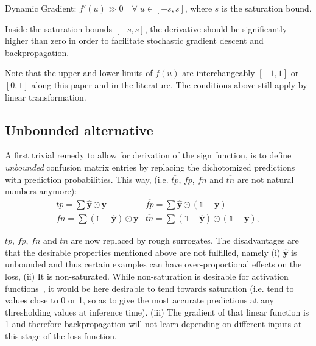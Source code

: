 \begin{property}
  Dynamic Gradient: $f'(u) \gg 0 \quad \forall \; u \in [-s, s]$, where $s$ is the saturation bound.
\end{property}

Inside the saturation bounds $[-s, s]$, the derivative should be significantly higher than zero in order to facilitate stochastic gradient descent and backpropagation.

Note that the upper and lower limits of $f(u)$ are interchangeably $[-1,1]$ or $[0,1]$ along this paper and in the literature. The conditions above still apply by linear transformation.


\subsection{Unbounded alternative}
\label{subsec:unbounded}

A first trivial remedy to allow for derivation of the sign function, is to define \emph{unbounded} confusion matrix entries by replacing the dichotomized predictions with prediction probabilities. This way,
 (i.e. \(\overline{tp}\), \(\overline{fp}\), \(\overline{fn}\) and  \(\overline{tn}\) are not natural numbers anymore):
%
\begin{equation}
\label{eq:unbounded}
\begin{array}{ll} \overline{\mathit{tp}} = \sum \hat{\mathbf{y}} \odot \mathbf{y}  & \overline{\mathit{fp}} = \sum \hat{\mathbf{y}} \odot (\mathds{1} - \mathbf{y}) \\[.5em] \overline{\mathit{fn}} = \sum (\mathds{1} - \hat{\mathbf{y}}) \odot \mathbf{y} & \overline{\mathit{tn}} = \sum (\mathds{1} - \hat{\mathbf{y}}) \odot (\mathds{1} - \mathbf{y}),
\end{array}
\end{equation}
%

\(tp\), \(fp\), \(fn\) and \(tn\) are now replaced by rough surrogates. The disadvantages are that the desirable properties mentioned above are not fulfilled, namely (i) \(\hat{\mathbf{y}}\) is unbounded and thus certain examples can have over-proportional effects on the loss, (ii) It is non-saturated. While non-saturation is desirable for activation functions~\cite{saturation}, it would be here desirable to tend towards saturation (i.e. tend to values close to 0 or 1, so as to give the most accurate predictions at any thresholding values at inference time). (iii) The gradient of that linear function is 1 and therefore backpropagation will not learn depending on different inputs at this stage of the loss function.

